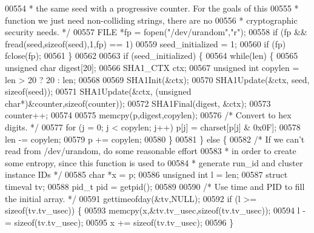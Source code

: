 \begin{DoxyCode}
{{{00554 \textcolor{comment}{         * the same seed with a progressive counter. For the goals of this}
00555 \textcolor{comment}{         * function we just need non-colliding strings, there are no}
00556 \textcolor{comment}{         * cryptographic security needs. */}
00557         FILE *fp = fopen(\textcolor{stringliteral}{"/dev/urandom"},\textcolor{stringliteral}{"r"});
00558         \textcolor{keywordflow}{if} (fp && fread(seed,\textcolor{keyword}{sizeof}(seed),1,fp) == 1)
00559             seed\_initialized = 1;
00560         \textcolor{keywordflow}{if} (fp) fclose(fp);
00561     \}
00562 
00563     \textcolor{keywordflow}{if} (seed\_initialized) \{
00564         \textcolor{keywordflow}{while}(len) \{
00565             \textcolor{keywordtype}{unsigned} \textcolor{keywordtype}{char} digest[20];
00566             SHA1\_CTX ctx;
00567             \textcolor{keywordtype}{unsigned} \textcolor{keywordtype}{int} copylen = len > 20 ? 20 : len;
00568 
00569             SHA1Init(&ctx);
00570             SHA1Update(&ctx, seed, \textcolor{keyword}{sizeof}(seed));
00571             SHA1Update(&ctx, (\textcolor{keywordtype}{unsigned} \textcolor{keywordtype}{char}*)&counter,\textcolor{keyword}{sizeof}(counter));
00572             SHA1Final(digest, &ctx);
00573             counter++;
00574 
00575             memcpy(p,digest,copylen);
00576             \textcolor{comment}{/* Convert to hex digits. */}
00577             \textcolor{keywordflow}{for} (j = 0; j < copylen; j++) p[j] = charset[p[j] & 0x0F];
00578             len -= copylen;
00579             p += copylen;
00580         \}
00581     \} \textcolor{keywordflow}{else} \{
00582         \textcolor{comment}{/* If we can't read from /dev/urandom, do some reasonable effort}
00583 \textcolor{comment}{         * in order to create some entropy, since this function is used to}
00584 \textcolor{comment}{         * generate run\_id and cluster instance IDs */}
00585         \textcolor{keywordtype}{char} *x = p;
00586         \textcolor{keywordtype}{unsigned} \textcolor{keywordtype}{int} l = len;
00587         \textcolor{keyword}{struct} timeval tv;
00588         pid\_t pid = getpid();
00589 
00590         \textcolor{comment}{/* Use time and PID to fill the initial array. */}
00591         gettimeofday(&tv,NULL);
00592         \textcolor{keywordflow}{if} (l >= \textcolor{keyword}{sizeof}(tv.tv\_usec)) \{
00593             memcpy(x,&tv.tv\_usec,\textcolor{keyword}{sizeof}(tv.tv\_usec));
00594             l -= \textcolor{keyword}{sizeof}(tv.tv\_usec);
00595             x += \textcolor{keyword}{sizeof}(tv.tv\_usec);
00596         \}
}}}
\end{DoxyCode}
